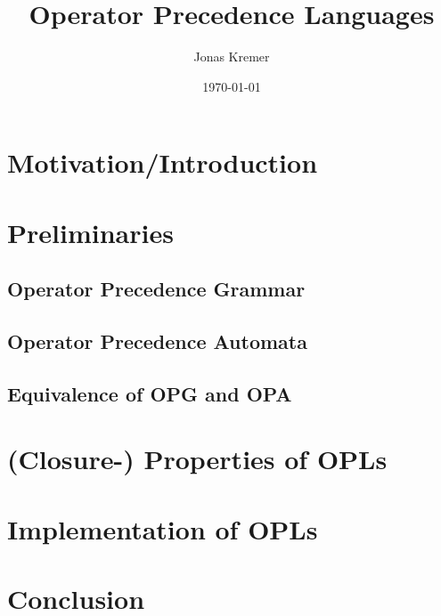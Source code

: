 \documentclass{article}
\author{Jonas Kremer}
\title{Operator Precedence Languages}
\date{\today{}}
\begin{document}
\maketitle
\newpage
\tableofcontents
\newpage
\section{Motivation/Introduction}

\section{Preliminaries}

\subsection{Operator Precedence Grammar}

\subsection{Operator Precedence Automata}

\subsection{Equivalence of OPG and OPA}

\section{(Closure-) Properties of OPLs}

\section{Implementation of OPLs}

\section{Conclusion}


\end{document}
